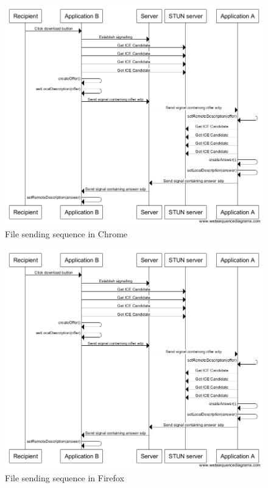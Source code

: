 \documentclass[]{report}
\begin{document}
			\begin{figure}[H]
				\caption{File sending sequence in Chrome}
				\centering
				\includegraphics[scale=0.5]{peer-connection-establishment-sequence-chrome.png}
			\end{figure}
			
			\begin{figure}[H]
				\caption{File sending sequence in Firefox}
				\centering
				\includegraphics[scale=0.5]{peer-connection-establishment-sequence-firefox.png}
			\end{figure}	
			
\end{document}
